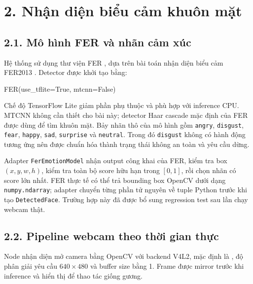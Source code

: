 \clearpage
\section*{2. Nhận diện biểu cảm khuôn mặt}

\subsection*{2.1. Mô hình FER và nhãn cảm xúc}

Hệ thống sử dụng thư viện FER \cite{ferlibrary}, dựa trên bài toán nhận diện
biểu cảm FER2013 \cite{fer2013}. Detector được khởi tạo bằng:

\begin{svcode}
FER(use_tflite=True, mtcnn=False)
\end{svcode}

Chế độ TensorFlow Lite \cite{tensorflowlite} giảm phần phụ thuộc và phù hợp với
inference CPU. MTCNN không cần thiết cho bài này; detector Haar cascade mặc
định của FER được dùng để tìm khuôn mặt. Bảy nhãn thô của mô hình gồm
\texttt{angry}, \texttt{disgust}, \texttt{fear}, \texttt{happy},
\texttt{sad}, \texttt{surprise} và \texttt{neutral}. Trong đó
\texttt{disgust} không có hành động tương ứng nên được chuẩn hóa thành trạng
thái không an toàn và yêu cầu dừng.

Adapter \texttt{FerEmotionModel} nhận output công khai của FER, kiểm tra box
$(x,y,w,h)$, kiểm tra toàn bộ score hữu hạn trong $[0,1]$, rồi chọn nhãn có
score lớn nhất. FER thực tế có thể trả bounding box OpenCV dưới dạng
\texttt{numpy.ndarray}; adapter chuyển từng phần tử nguyên về tuple Python
trước khi tạo \texttt{DetectedFace}. Trường hợp này đã được bổ sung regression
test sau lần chạy webcam thật.

\subsection*{2.2. Pipeline webcam theo thời gian thực}

Node nhận diện mở camera bằng OpenCV \cite{opencv} với backend V4L2, mặc định
là , độ phân giải yêu cầu $640\times480$ và buffer size bằng
1. Frame được mirror trước khi inference và hiển thị để thao tác giống gương.

